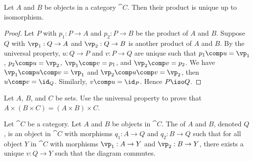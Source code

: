 \documentclass[10pt]{article}
\begin{document}
\begin{proposition}
    Let $A$ and $B$ be objects in a category $\cat{C}$. Then their product is unique up to isomorphism.
\end{proposition}
\begin{proof}
    Let $P$ with ${p}_{1}:P\to A$ and ${p}_{2}:P\to B$ be the product of $A$ and $B$. Suppose $Q$ with ${\vp}_{1}:Q\to A$ and ${\vp}_{2}:Q\to B$ is another product of $A$ and $B$. By the universal property, $u:Q\to P$ and $v:P\to Q$ are unique such that ${p}_{1}\comp u={\vp}_{1}$, ${p}_{2}\comp u={\vp}_{2}$, ${\vp}_{1}\comp v={p}_{1}$, and ${\vp}_{2}\comp v={p}_{2}$. We have ${\vp}_{1}\comp u\comp v={\vp}_{1}$ and ${\vp}_{2}\comp u\comp v={\vp}_{2}$, then $u\comp v={\id}_{Q}$. Similarly, $v\comp u={\id}_{P}$. Hence $P\iso Q$.
\end{proof}
\begin{center}
\end{center}
\begin{problem}
    Let $A$, $B$, and $C$ be sets. Use the universal property to prove that $A\times(B\times C)=(A\times B)\times C$.
\end{problem}
\begin{definition}
    Let $\cat{C}$ be a category. Let $A$ and $B$ be objects in $\cat{C}$. The  of $A$ and $B$, denoted $Q$, is an object in $\cat{C}$ with morphisms ${q}_{1}:A\to Q$ and ${q}_{2}:B\to Q$ such that for all object $Y$ in $\cat{C}$ with morphisms ${\vp}_{1}:A\to Y$ and ${\vp}_{2}:B\to Y$, there exists a unique $v:Q\to Y$ such that the diagram commutes.
\end{definition}
\begin{center}
\end{center}
\end{document}
